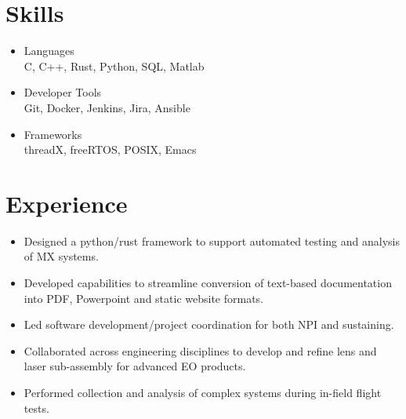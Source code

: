 \documentclass[a4paper,ragged2e,withhyper]{altacv}
\begin{document}
{\divider

\divider



\section{Skills}
\label{sec:orgce0650d}
\begin{itemize}
\item Languages\\
C, C++, Rust, Python, SQL, Matlab\\
\item Developer Tools\\
Git, Docker, Jenkins, Jira, Ansible\\
\item Frameworks\\
threadX, freeRTOS, POSIX, Emacs\\
\end{itemize}

}
\section{Experience}
\label{sec:org12dd237}


\begin{itemize}
\item Designed a python/rust framework to support automated testing and analysis of MX systems.\\
\item Developed capabilities to streamline conversion of text-based documentation into PDF, Powerpoint and static website formats.\\
\item Led software development/project coordination for both NPI and sustaining.\\
\item Collaborated across engineering disciplines to develop and refine lens and laser sub-assembly for advanced EO products.\\
\item Performed collection and analysis of complex systems during in-field flight tests.\\
\end{itemize}
\end{document}
